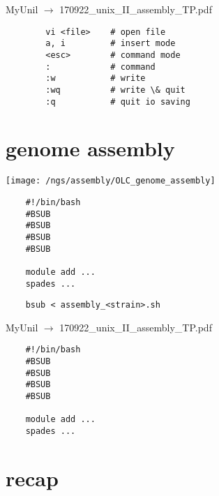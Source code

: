 \documentclass[xcolor=dvipsnames]{beamer}
\begin{document}
\begin{frame}[fragile]
	\begin{center}
		\Large
		MyUnil $\rightarrow$ 170922\_unix\_II\_assembly\_TP.pdf
	\end{center}
	\Large
	\begin{verbatim}
		vi <file>    # open file
		a, i         # insert mode
		<esc>        # command mode
		:            # command
		:w           # write
		:wq          # write \& quit
		:q           # quit io saving
	\end{verbatim}
\end{frame}

\section{genome assembly}

\begin{frame}
	\begin{center}
		\texttt{[image: /ngs/assembly/OLC\_genome\_assembly]}
	\end{center}
\end{frame}

\begin{frame}[fragile]
	\begin{verbatim}
	#!/bin/bash
	#BSUB
	#BSUB
	#BSUB
	#BSUB

	module add ...
	spades ...
	\end{verbatim}
\end{frame}

\begin{frame}[fragile]
	\begin{verbatim}
	bsub < assembly_<strain>.sh
	\end{verbatim}
\end{frame}

\begin{frame}[fragile]
	\begin{center}
		\Large
		MyUnil $\rightarrow$ 170922\_unix\_II\_assembly\_TP.pdf
	\end{center}
\Large
\begin{verbatim}
	#!/bin/bash
	#BSUB
	#BSUB
	#BSUB
	#BSUB

	module add ...
	spades ...
\end{verbatim}
\end{frame}


\section{recap}
\end{document}
